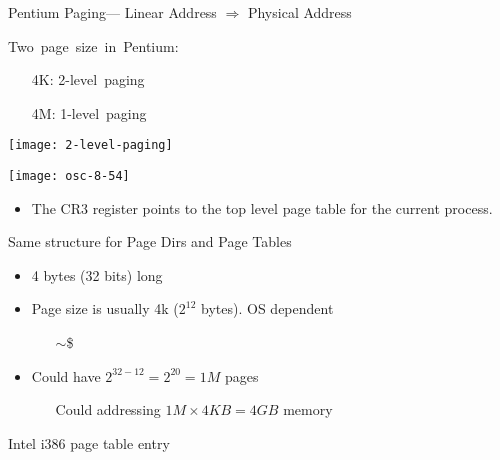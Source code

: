 \begin{frame}{Pentium Paging}{--- Linear Address $\Rightarrow$ Physical Address}
  \begin{varwidth}{.4\textwidth}
    \mbox{Two page size in Pentium:}
    \begin{small}
      \begin{itemize}
      \item[4K:] \mbox{2-level paging}%
      \item[4M:] \mbox{1-level paging}%
      \end{itemize}
    \end{small}
    \begin{center}
      \texttt{[image: 2-level-paging]}
    \end{center}
  \end{varwidth}\qquad
  \begin{varwidth}{.5\textwidth}
    \texttt{[image: osc-8-54]}
  \end{varwidth}
\end{frame}

\begin{itemize}
\item The CR3 register points to the top level page table for the current process.
\end{itemize}

\begin{frame}%
  \begin{block}{Same structure for Page Dirs and Page Tables}
    \begin{itemize}
    \item 4 bytes (32 bits) long
    \item Page size is usually 4k ($2^{12}$ bytes). OS dependent
      \begin{itemize}
      \item[] $\sim$\$ 
      \end{itemize}
    \item Could have $2^{32-12}=2^{20}=1M$ pages
      \begin{itemize}
      \item[] Could addressing $1M\times{}4KB=4GB$ memory
      \end{itemize}
    \end{itemize}
  \end{block}
  \begin{block}{Intel i386 page table entry}
    \begin{center}
       
    \end{center}
  \end{block}
\end{frame}

